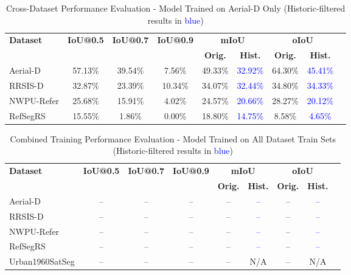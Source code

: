 \begin{table}[H]
\centering
\caption{Cross-Dataset Performance Evaluation - Model Trained on Aerial-D Only (Historic-filtered results in \textcolor{blue}{blue})}
\label{tab:cross_dataset_results}
\begin{tabular}{@{}lcccccccc@{}}
\toprule
\textbf{Dataset} & \textbf{IoU@0.5} & \textbf{IoU@0.7} & \textbf{IoU@0.9} & \multicolumn{2}{c}{\textbf{mIoU}} & \multicolumn{2}{c}{\textbf{oIoU}} \\
\cmidrule(lr){5-6} \cmidrule(lr){7-8}
 & & & & \textbf{Orig.} & \textbf{Hist.} & \textbf{Orig.} & \textbf{Hist.} \\
\midrule
Aerial-D & 57.13\% & 39.54\% & 7.56\% & 49.33\% & \textcolor{blue}{32.92\%} & 64.30\% & \textcolor{blue}{45.41\%} \\
RRSIS-D & 32.87\% & 23.39\% & 10.34\% & 34.07\% & \textcolor{blue}{32.44\%} & 34.80\% & \textcolor{blue}{34.33\%} \\
NWPU-Refer & 25.68\% & 15.91\% & 4.02\% & 24.57\% & \textcolor{blue}{20.66\%} & 28.27\% & \textcolor{blue}{20.12\%} \\
RefSegRS & 15.55\% & 1.86\% & 0.00\% & 18.80\% & \textcolor{blue}{14.75\%} & 8.58\% & \textcolor{blue}{4.65\%} \\
\bottomrule
\end{tabular}
\end{table}

\begin{table}[H]
\centering
\caption{Combined Training Performance Evaluation - Model Trained on All Dataset Train Sets (Historic-filtered results in \textcolor{blue}{blue})}
\label{tab:combined_training_results}
\begin{tabular}{@{}lcccccccc@{}}
\toprule
\textbf{Dataset} & \textbf{IoU@0.5} & \textbf{IoU@0.7} & \textbf{IoU@0.9} & \multicolumn{2}{c}{\textbf{mIoU}} & \multicolumn{2}{c}{\textbf{oIoU}} \\
\cmidrule(lr){5-6} \cmidrule(lr){7-8}
 & & & & \textbf{Orig.} & \textbf{Hist.} & \textbf{Orig.} & \textbf{Hist.} \\
\midrule
Aerial-D & -- & -- & -- & -- & \textcolor{blue}{--} & -- & \textcolor{blue}{--} \\
RRSIS-D & -- & -- & -- & -- & \textcolor{blue}{--} & -- & \textcolor{blue}{--} \\
NWPU-Refer & -- & -- & -- & -- & \textcolor{blue}{--} & -- & \textcolor{blue}{--} \\
RefSegRS & -- & -- & -- & -- & \textcolor{blue}{--} & -- & \textcolor{blue}{--} \\
Urban1960SatSeg & -- & -- & -- & -- & N/A & -- & N/A \\
\bottomrule
\end{tabular}
\end{table}

